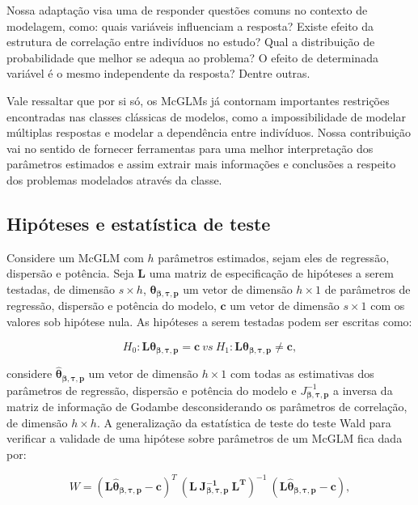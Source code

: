 Nossa adaptação visa uma de responder questões comuns no contexto de modelagem, como: quais variáveis influenciam a resposta? Existe efeito da estrutura de correlação entre indivíduos no estudo? Qual a distribuição de probabilidade que melhor se adequa ao problema? O efeito de determinada variável é o mesmo independente da resposta? Dentre outras.

Vale ressaltar que por si só, os McGLMs já contornam importantes restrições encontradas nas classes clássicas de modelos, como a impossibilidade de modelar múltiplas respostas e modelar a dependência entre indivíduos. Nossa contribuição vai no sentido de fornecer ferramentas para uma melhor interpretação dos parâmetros estimados e assim extrair mais informações e conclusões a respeito dos problemas modelados através da classe.

\subsection{Hipóteses e estatística de teste}

Considere um McGLM com $h$ parâmetros estimados, sejam eles de regressão, dispersão e potência. Seja $\boldsymbol{L}$ uma matriz de especificação de hipóteses a serem testadas, de dimensão $s \times h$, $\boldsymbol{\theta_{\beta,\tau,p}}$ um vetor de dimensão $h \times 1$ de parâmetros de regressão, dispersão e potência do modelo, $\boldsymbol{c}$ um vetor de dimensão $s \times 1$ com os valores sob hipótese nula. As hipóteses a serem testadas podem ser escritas como:

\begin{equation}
\label{eq:hipoteses_wald}
H_0: \boldsymbol{L}\boldsymbol{\theta_{\beta,\tau,p}} = \boldsymbol{c} \ vs \ H_1: \boldsymbol{L}\boldsymbol{\theta_{\beta,\tau,p}} \neq \boldsymbol{c}, 
\end{equation}

\noindent considere $\boldsymbol{\hat\theta_{\beta,\tau,p}}$ um vetor de dimensão $h \times 1$ com todas as estimativas dos parâmetros de regressão, dispersão e potência do modelo e $J_{\boldsymbol{{\beta,\tau,p}}}^{-1}$ a inversa da matriz de informação de Godambe desconsiderando os parâmetros de correlação, de dimensão $h \times h$. A generalização da estatística de teste do teste Wald para verificar a validade de uma hipótese sobre parâmetros de um McGLM fica dada por:

\begin{equation}
W = (\boldsymbol{L\hat\theta_{\beta,\tau,p}} - \boldsymbol{c})^T \ (\boldsymbol{L \ J_{\boldsymbol{{\beta,\tau,p}}}^{-1} \ L^T})^{-1} \ (\boldsymbol{L\hat\theta_{\beta,\tau,p}} - \boldsymbol{c}),
\end{equation}

